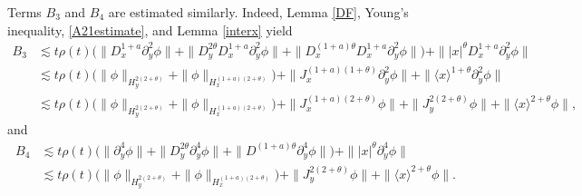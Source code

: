 \documentclass[reqno]{amsart}
\newcommand{\lanx}{\langle x \rangle}
\newcommand{\p}{\partial}
\numberwithin{equation}{section}
\begin{document}
Terms $B_3$ and $B_4$ are estimated similarly. Indeed, Lemma \ref{DF}, Young's inequality, \eqref{A21estimate}, and Lemma \ref{interx} yield
\begin{equation*}
\begin{split}
B_3&\lesssim  t\rho(t) \Big(\|D^{1+a}_x \p_y^2 \phi\|+\|D_y^{2\theta} D^{1+a}_x\p_y^2 \phi\|+\|D^{(1+a)\theta}_xD^{1+a}_x \p_y^2 \phi\|\Big)+\||x|^\theta D^{1+a}_x \p_y^2\phi\|\\
&\lesssim t\rho(t)\Big(\|\phi\|_{H^{2(2+\theta)}_y}+\| \phi\|_{H^{(1+a)(2+\theta)}_x}\Big)+ \|J_x^{(1+a)(1+\theta)}\partial_y^2\phi\|+\|\lanx^{1+\theta}\partial_y^2\phi\|\\
&\lesssim t\rho(t)\Big(\|\phi\|_{H^{2(2+\theta)}_y}+\| \phi\|_{H^{(1+a)(2+\theta)}_x}\Big)+
\|J_x^{(1+a)(2+\theta)}\phi\|+\|J_y^{2(2+\theta)}\phi\|+\|\lanx^{2+\theta}\phi\|,
\end{split}
\end{equation*}
and
\begin{equation*}
\begin{split}
B_4 &\lesssim  t\rho(t)\Big(\|\p_y^4 \phi\|+\|D_y^{2\theta} \p_y^4  \phi\|+\|D^{(1+a)\theta}\p_y^4 \phi\|\Big)+\||x|^\theta \p_y^4 \phi\|\\
& \lesssim t\rho(t)\Big(\|\phi\|_{H^{2(2+\theta)}_y}+\| \phi\|_{H^{(1+a)(2+\theta)}_x}\Big)+\|J_y^{2(2+\theta)}\phi\|+\|\lanx^{2+\theta}\phi\|.
\end{split}
\end{equation*}
\end{document}
